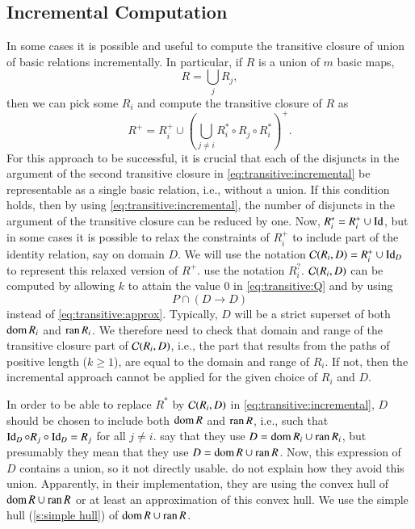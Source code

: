 \subsection{Incremental Computation}
\label{s:incremental}

In some cases it is possible and useful to compute the transitive closure
of union of basic relations incrementally.  In particular,
if $R$ is a union of $m$ basic maps,
$$
R = \bigcup_j R_j
,
$$
then we can pick some $R_i$ and compute the transitive closure of $R$ as
\begin{equation}
\label{eq:transitive:incremental}
R^+ = R_i^+ \cup
\left(
\bigcup_{j \ne i}
R_i^* \circ R_j \circ R_i^*
\right)^+
.
\end{equation}
For this approach to be successful, it is crucial that each
of the disjuncts in the argument of the second transitive
closure in \eqref{eq:transitive:incremental} be representable
as a single basic relation, i.e., without a union.
If this condition holds, then by using \eqref{eq:transitive:incremental},
the number of disjuncts in the argument of the transitive closure
can be reduced by one.
Now, $R_i^* = R_i^+ \cup \mathop{\rm Id}\nolimits$, but in some cases it is possible
to relax the constraints of $R_i^+$ to include part of the identity relation,
say on domain $D$.  We will use the notation
${\cal C}(R_i,D) = R_i^+ \cup \mathop{\rm Id}\nolimits_D$ to represent
this relaxed version of $R^+$.
 use the notation $R_i^?$.
${\cal C}(R_i,D)$ can be computed by allowing $k$ to attain
the value $0$ in \eqref{eq:transitive:Q} and by using
$$
P \cap \left(D \to D\right)
$$
instead of \eqref{eq:transitive:approx}.
Typically, $D$ will be a strict superset of both $\mathop{\rm dom}\nolimits R_i$
and $\mathop{\rm ran}\nolimits R_i$.  We therefore need to check that domain
and range of the transitive closure part of ${\cal C}(R_i,D)$,
i.e., the part that results from the paths of positive length ($k \ge 1$),
are equal to the domain and range of $R_i$.
If not, then the incremental approach cannot be applied for
the given choice of $R_i$ and $D$.

In order to be able to replace $R^*$ by ${\cal C}(R_i,D)$
in \eqref{eq:transitive:incremental}, $D$ should be chosen
to include both $\mathop{\rm dom}\nolimits R$ and $\mathop{\rm ran}\nolimits R$, i.e., such
that $\mathop{\rm Id}\nolimits_D \circ R_j \circ \mathop{\rm Id}\nolimits_D = R_j$ for all $j\ne i$.
 say that they use
$D = \mathop{\rm dom}\nolimits R_i \cup \mathop{\rm ran}\nolimits R_i$, but presumably they mean that
they use $D = \mathop{\rm dom}\nolimits R \cup \mathop{\rm ran}\nolimits R$.
Now, this expression of $D$ contains a union, so it not directly usable.
 do not explain how they avoid this union.
Apparently, in their implementation,
they are using the convex hull of $\mathop{\rm dom}\nolimits R \cup \mathop{\rm ran}\nolimits R$
or at least an approximation of this convex hull.
We use the simple hull (\autoref{s:simple hull}) of $\mathop{\rm dom}\nolimits R \cup \mathop{\rm ran}\nolimits R$.

